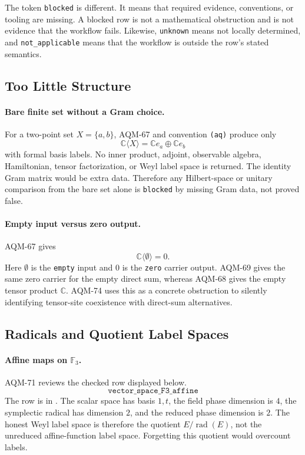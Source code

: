 The token \texttt{blocked} is different.  It means that required evidence,
conventions, or tooling are missing.  A blocked row is not a mathematical
obstruction and is not evidence that the workflow fails.  Likewise,
\texttt{unknown} means not locally determined, and \texttt{not\_applicable}
means that the workflow is outside the row's stated semantics.

\subsection{Too Little Structure}

\paragraph{Bare finite set without a Gram choice.}
For a two-point set \(X=\{a,b\}\), AQM-67 and convention \texttt{(aq)}
produce only
\[
  \mathbb C\langle X\rangle=\mathbb C e_a\oplus\mathbb C e_b
\]
with formal basis labels.  No inner product, adjoint, observable algebra,
Hamiltonian, tensor factorization, or Weyl label space is returned.  The
identity Gram matrix would be extra data.  Therefore any Hilbert-space or
unitary comparison from the bare set alone is \texttt{blocked} by missing
Gram data, not proved false.

\paragraph{Empty input versus zero output.}
AQM-67 gives
\[
  \mathbb C\langle\emptyset\rangle=0 .
\]
Here \(\emptyset\) is the \texttt{empty} input and \(0\) is the \texttt{zero}
carrier output.  AQM-69 gives the same zero carrier for the empty direct sum,
whereas AQM-68 gives the empty tensor product \(\mathbb C\).  AQM-74 uses
this as a concrete obstruction to silently identifying tensor-site
coexistence with direct-sum alternatives.

\subsection{Radicals and Quotient Label Spaces}

\paragraph{Affine maps on \(\mathbb F_3\).}
AQM-71 reviews the checked row displayed below.
\[
  \texttt{vector\_space\_F3\_affine}
\]
The row is in
.  The scalar space has
basis \(1,t\), the field phase dimension is \(4\), the symplectic radical has
dimension \(2\), and the reduced phase dimension is \(2\).  The honest Weyl
label space is therefore the quotient \(E/\operatorname{rad}(E)\), not the
unreduced affine-function label space.  Forgetting this quotient would
overcount labels.


